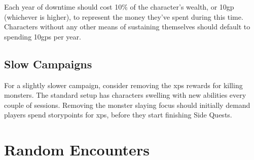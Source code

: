 \begin{multicols}{2}
{\begin{rollchart}
\end{rollchart}

}

Each year of downtime should cost 10\% of the character's wealth, or 10\gls{gp} (whichever is higher), to represent the money they've spent during this time.
Characters without any other means of sustaining themselves should default to spending 10\glspl{gp} per year.

\subsection{Slow Campaigns}

For a slightly slower campaign, consider removing the \glspl{xp} rewards for killing monsters.
The standard setup has characters swelling with new abilities every couple of sessions.
Removing the monster slaying focus should initially demand players spend \glspl{storypoint} for \glspl{xp}, before they start finishing Side Quests.

\end{multicols}

\section{Random Encounters}
\label{encounters}

